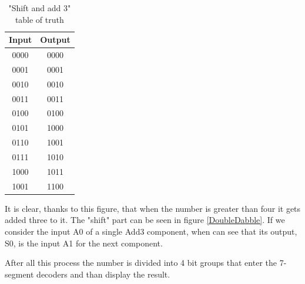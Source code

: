 \documentclass{article}
\begin{document}
\begin{table}[h]
  \centering
  \begin{tabular}{||c|c||}
    \hline
    Input & Output \\
    \hline
    0000 & 0000 \\
    0001 & 0001 \\
    0010 & 0010 \\ 
    0011 & 0011 \\
    0100 & 0100 \\
    0101 & 1000 \\
    0110 & 1001 \\
    0111 & 1010 \\
    1000 & 1011 \\
    1001 & 1100 \\
    \hline
  \end{tabular}
    \label{Add3Table}
    \caption{"Shift and add 3" table of truth}
  \end{table}

It is clear, thanks to this figure, that when the number is greater than four it gets added three to it. The "shift" part can be seen in figure \ref{DoubleDabble}. If we consider the input A0 of a single Add3 component, when can see that its output, S0, is the input A1 for the next component.

After all this process the number is divided into 4 bit groups that enter the 7-segment decoders and than display the result.
\end{document}
